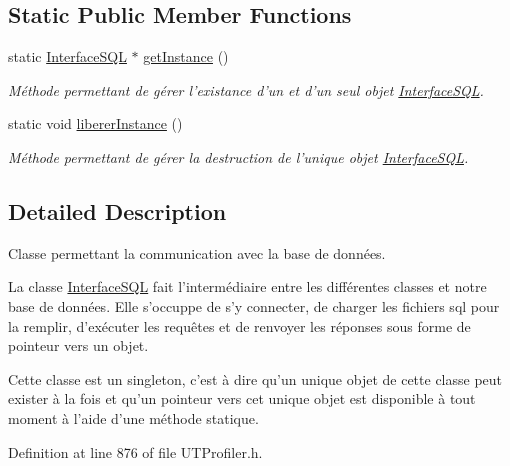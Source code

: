 \subsection*{Static Public Member Functions}
\begin{DoxyCompactItemize}
\item 
static \hyperlink{class_interface_s_q_l}{Interface\-S\-Q\-L} $\ast$ \hyperlink{class_interface_s_q_l_a2030b0c3cf1dfcb825b259091e4d2ae3}{get\-Instance} ()
\begin{DoxyCompactList}\small\item\em Méthode permettant de gérer l'existance d'un et d'un seul objet \hyperlink{class_interface_s_q_l}{Interface\-S\-Q\-L}. \end{DoxyCompactList}\item 
\hypertarget{class_interface_s_q_l_ab2579eb5e175e0a5a66bfa207bc5ab2b}{static void \hyperlink{class_interface_s_q_l_ab2579eb5e175e0a5a66bfa207bc5ab2b}{liberer\-Instance} ()}\label{class_interface_s_q_l_ab2579eb5e175e0a5a66bfa207bc5ab2b}

\begin{DoxyCompactList}\small\item\em Méthode permettant de gérer la destruction de l'unique objet \hyperlink{class_interface_s_q_l}{Interface\-S\-Q\-L}. \end{DoxyCompactList}\end{DoxyCompactItemize}


\subsection{Detailed Description}
Classe permettant la communication avec la base de données. 

La classe \hyperlink{class_interface_s_q_l}{Interface\-S\-Q\-L} fait l'intermédiaire entre les différentes classes et notre base de données. Elle s'occuppe de s'y connecter, de charger les fichiers sql pour la remplir, d'exécuter les requêtes et de renvoyer les réponses sous forme de pointeur vers un objet.

Cette classe est un singleton, c'est à dire qu'un unique objet de cette classe peut exister à la fois et qu'un pointeur vers cet unique objet est disponible à tout moment à l'aide d'une méthode statique. 

Definition at line 876 of file U\-T\-Profiler.\-h.



